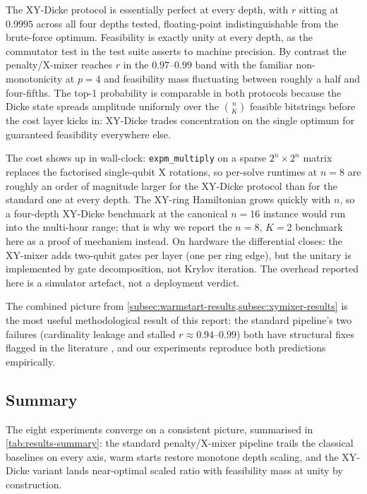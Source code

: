The XY-Dicke protocol is essentially perfect at every depth, with $r$ sitting at $0.9995$ across all four depths tested, floating-point indistinguishable from the brute-force optimum. Feasibility is exactly unity at every depth, as the commutator test in the test suite asserts to machine precision. By contrast the penalty/X-mixer reaches $r$ in the $0.97$--$0.99$ band with the familiar non-monotonicity at $p=4$ and feasibility mass fluctuating between roughly a half and four-fifths. The top-1 probability is comparable in both protocols because the Dicke state spreads amplitude uniformly over the $\binom{n}{K}$ feasible bitstrings before the cost layer kicks in: XY-Dicke trades concentration on the single optimum for guaranteed feasibility everywhere else.

The cost shows up in wall-clock: \texttt{expm\_multiply} on a sparse $2^n\times 2^n$ matrix replaces the factorised single-qubit X rotations, so per-solve runtimes at $n=8$ are roughly an order of magnitude larger for the XY-Dicke protocol than for the standard one at every depth. The XY-ring Hamiltonian grows quickly with $n$, so a four-depth XY-Dicke benchmark at the canonical $n=16$ instance would run into the multi-hour range; that is why we report the $n=8$, $K=2$ benchmark here as a proof of mechanism instead. On hardware the differential closes: the XY-mixer adds two-qubit gates per layer (one per ring edge), but the unitary is implemented by gate decomposition, not Krylov iteration. The overhead reported here is a simulator artefact, not a deployment verdict.

The combined picture from \cref{subsec:warmstart-results,subsec:xymixer-results} is the most useful methodological result of this report: the standard pipeline's two failures (cardinality leakage and stalled $r \approx 0.94$--$0.99$) both have structural fixes flagged in the literature \parencite{zhou2018qaoa,mancilla2026constrained}, and our experiments reproduce both predictions empirically.


\subsection{Summary}\label{subsec:results-summary}

The eight experiments converge on a consistent picture, summarised in \cref{tab:results-summary}: the standard penalty/X-mixer pipeline trails the classical baselines on every axis, warm starts restore monotone depth scaling, and the XY-Dicke variant lands near-optimal scaled ratio with feasibility mass at unity by construction.

